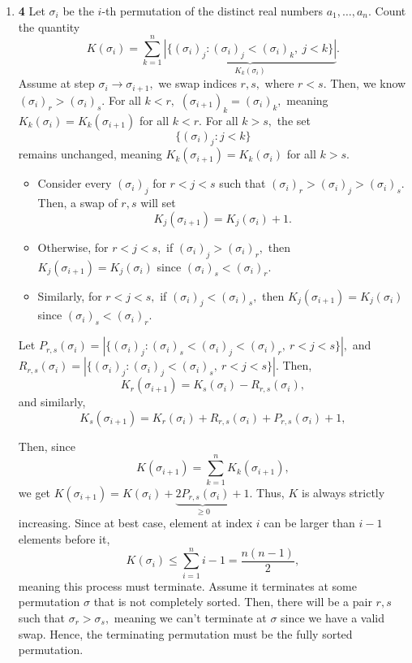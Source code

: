\documentclass[12pt]{article}
\begin{document}
\begin{enumerate}
    Therefore, the process must terminate, meaning there must be some
    $a_j, b_j$ such that $a_j = b_j.$ Then, by the invariance of $S,$
    we have $S_j = \gcd(a, b) = a_j,$ meaning $a_j = b_j = \gcd(a,
    b)$ once the process terminates.

  \item \textbf{4} Let $\sigma_i$ be the $i$-th permutation of the
    distinct real numbers $a_1, \ldots, a_n.$ Count the quantity
    $$
    K(\sigma_i) = \sum_{k = 1}^{n} \underbrace{|\{(\sigma_i)_j :
    (\sigma_i)_j < (\sigma_i)_k,\ j < k\}|}_{K_{k}(\sigma_i)}.
    $$
    Assume at step $\sigma_i \to \sigma_{i + 1},$ we swap indices $r,
    s,$ where $r < s.$ Then, we know $(\sigma_i)_r > (\sigma_i)_s.$
    For all $k < r,$ $(\sigma_{i + 1})_k = (\sigma_i)_k,$ meaning
    $K_{k}(\sigma_i) = K_k(\sigma_{i + 1})$ for all $k < r.$ For all
    $k > s,$ the set
    $$
    \{(\sigma_i)_j : j < k\}
    $$
    remains unchanged, meaning $K_k(\sigma_{i + 1}) = K_k(\sigma_i)$
    for all $k > s.$
    \begin{itemize}
      \item Consider every $(\sigma_i)_j$ for $r < j < s$ such that
        $(\sigma_i)_r > (\sigma_i)_j > (\sigma_i)_s.$ Then, a swap of
        $r, s$ will set
        $$
        K_{j}(\sigma_{i + 1}) = K_{j}(\sigma_{i}) + 1.
        $$

      \item Otherwise, for $r < j < s,$ if $(\sigma_i)_{j} >
        (\sigma_i)_r,$ then $K_j(\sigma_{i + 1}) = K_j(\sigma_i)$
        since $(\sigma_i)_s < (\sigma_i)_r.$

      \item Similarly, for $r < j < s,$ if $(\sigma_i)_{j} <
        (\sigma_i)_s,$ then $K_j(\sigma_{i + 1}) = K_j(\sigma_i)$
        since $(\sigma_i)_s < (\sigma_i)_r.$
    \end{itemize}

    Let $P_{r, s}(\sigma_i) = |\{(\sigma_i)_j : (\sigma_i)_s <
    (\sigma_i)_j < (\sigma_i)_r, \ r < j < s\}|, $ and $R_{r,
    s}(\sigma_i) = |\{(\sigma_i)_j : (\sigma_i)_j < (\sigma_i)_s, \ r
    < j < s\}|.$ Then,
    $$
    K_r(\sigma_{i + 1}) = K_{s}(\sigma_{i}) - R_{r, s}(\sigma_i),
    $$
    and similarly,
    $$
    K_s(\sigma_{i + 1}) = K_{r}(\sigma_{i}) + R_{r, s}(\sigma_i) +
    P_{r, s}(\sigma_i) + 1,
    $$

    Then, since $$K(\sigma_{i + 1}) = \sum_{k = 1}^{n}K_k(\sigma_{i +
    1}),$$ we get $K(\sigma_{i + 1}) = K(\sigma_{i}) +
    \underbrace{2P_{r, s}(\sigma_i)}_{\geq 0} + 1.$ Thus, $K$ is
    always strictly increasing. Since at best case, element at index
    $i$ can be larger than $i - 1$ elements before it,
    $$
    K(\sigma_i) \leq \sum_{i = 1}^{n} i -1 = \dfrac{n(n-1)}{2},
    $$
    meaning this process must terminate. Assume it terminates at some
    permutation $\sigma$ that is not completely sorted. Then, there
    will be a pair $r, s$ such that $\sigma_r > \sigma_s,$ meaning we
    can't terminate at $\sigma$ since we have a valid swap. Hence,
    the terminating permutation must be the fully sorted permutation.


\end{enumerate}
\end{document}
